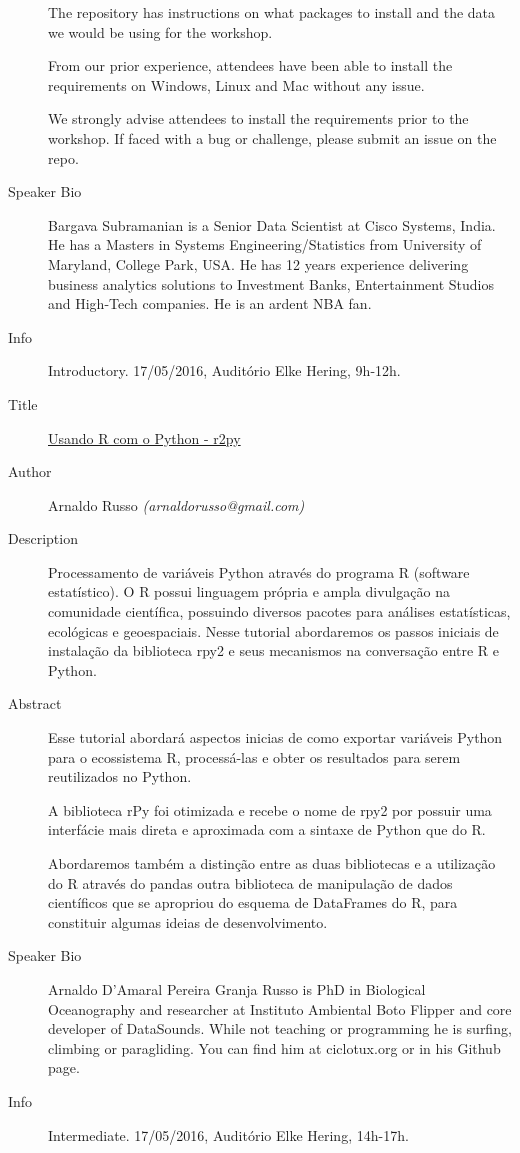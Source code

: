 \begin{description}
The repository has instructions on what packages to install and the data we would be using for the workshop.

From our prior experience, attendees have been able to install the requirements on Windows, Linux and Mac without any issue.

We strongly advise attendees to install the requirements prior to the workshop. If faced with a bug or challenge, please submit an issue on the repo.
    \item[Speaker Bio] Bargava Subramanian is a Senior Data Scientist at Cisco Systems, India. He has a Masters in Systems Engineering/Statistics from University of Maryland, College Park, USA. He has 12 years experience delivering business analytics solutions to Investment Banks, Entertainment Studios and High-Tech companies. He is an ardent NBA fan.
    \item[Info] Introductory. 17/05/2016, Auditório Elke Hering, 9h-12h.
\end{description} 
\begin{description}
   \item[Title] \underline{Usando R com o Python - r2py}
   \item[Author] Arnaldo Russo \emph{(arnaldorusso@gmail.com)}
   \item[Description] Processamento de variáveis Python através do programa R (software estatístico). O R possui linguagem própria e ampla divulgação na comunidade científica, possuindo diversos pacotes para análises estatísticas, ecológicas e geoespaciais. Nesse tutorial abordaremos os passos iniciais de instalação da biblioteca rpy2 e seus mecanismos na conversação entre R e Python. 
   \item[Abstract] Esse tutorial abordará aspectos inicias de como exportar variáveis Python para o ecossistema R, processá-las e obter os resultados para serem reutilizados no Python.

    A biblioteca rPy foi otimizada e recebe o nome de rpy2 por possuir uma interfácie mais direta e aproximada com a sintaxe de Python que do R.

    Abordaremos também a distinção entre as duas bibliotecas e a utilização do R através do pandas outra biblioteca de manipulação de dados científicos que se apropriou do esquema de DataFrames do R, para constituir algumas ideias de desenvolvimento.
    \item[Speaker Bio] Arnaldo D'Amaral Pereira Granja Russo is PhD in Biological Oceanography and researcher at Instituto Ambiental Boto Flipper and core developer of DataSounds. While not teaching or programming he is surfing, climbing or paragliding. You can find him at ciclotux.org or in his Github page.
    \item[Info] Intermediate. 17/05/2016, Auditório Elke Hering, 14h-17h.
\end{description} 
